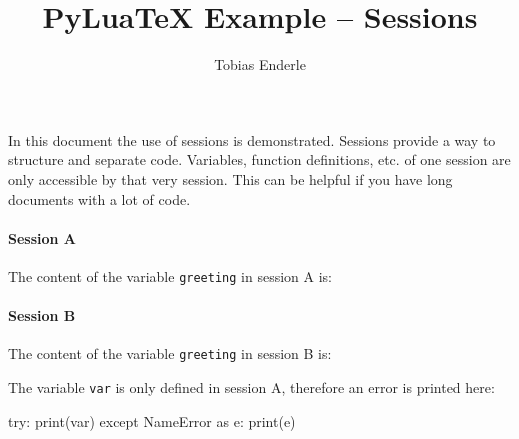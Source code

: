 \documentclass{article}
\title{PyLuaTeX Example -- Sessions}
\author{Tobias Enderle}
\begin{document}
\maketitle

In this document the use of sessions is demonstrated.
Sessions provide a way to structure and separate code.
Variables, function definitions, etc. of one session are only accessible
by that very session.
This can be helpful if you have long documents with a lot of code.

\paragraph{Session A}
The content of the variable \texttt{greeting} in session A is:\\

\paragraph{Session B}
The content of the variable \texttt{greeting} in session B is:\\

The variable \texttt{var} is only defined in session A, therefore
an error is printed here:
\begin{python}
try:
    print(var)
except NameError as e:
    print(e)
\end{python}
\end{document}
